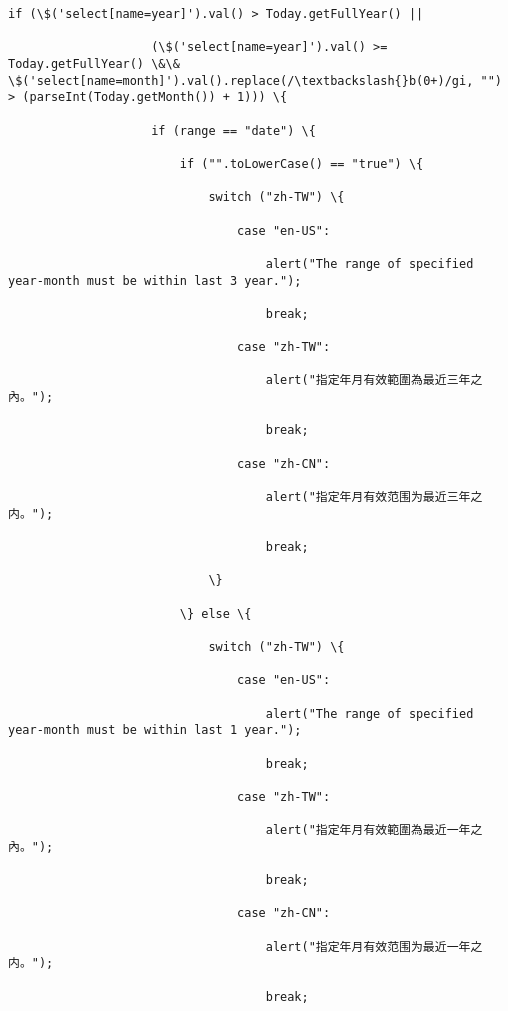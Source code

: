 \documentclass[11pt]{article}
\begin{document}
\begin{Verbatim}[commandchars=\\\{\}]
                if (\$('select[name=year]').val() > Today.getFullYear() ||

                    (\$('select[name=year]').val() >= Today.getFullYear() \&\& \$('select[name=month]').val().replace(/\textbackslash{}b(0+)/gi, "") > (parseInt(Today.getMonth()) + 1))) \{

                    if (range == "date") \{

                        if ("".toLowerCase() == "true") \{

                            switch ("zh-TW") \{

                                case "en-US":

                                    alert("The range of specified year-month must be within last 3 year.");

                                    break;

                                case "zh-TW":

                                    alert("指定年月有效範圍為最近三年之內。");

                                    break;

                                case "zh-CN":

                                    alert("指定年月有效范围为最近三年之内。");

                                    break;

                            \}

                        \} else \{

                            switch ("zh-TW") \{

                                case "en-US":

                                    alert("The range of specified year-month must be within last 1 year.");

                                    break;

                                case "zh-TW":

                                    alert("指定年月有效範圍為最近一年之內。");

                                    break;

                                case "zh-CN":

                                    alert("指定年月有效范围为最近一年之内。");

                                    break;


\end{Verbatim}
\end{document}
